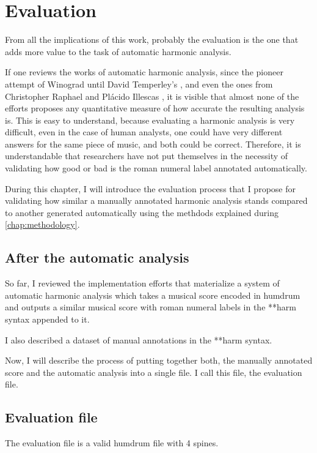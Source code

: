 \chapter{Evaluation}
\label{chap:evaluation}
From all the implications of this work, probably the evaluation is the one that adds more value to the task of automatic harmonic analysis.

If one reviews the works of automatic harmonic analysis, since the pioneer attempt of Winograd \cite{winograd1968linguistics} until David Temperley's \cite{temperley1997algorithm}, and even the ones from Christopher Raphael \cite{raphael2003harmonic} and Pl\'acido Illescas \cite{illescas2007harmonic}, it is visible that almost none of the efforts proposes any quantitative measure of how accurate the resulting analysis is. This is easy to understand, because evaluating a harmonic analysis is very difficult, even in the case of human analysts, one could have very different answers for the same piece of music, and both could be correct. Therefore, it is understandable that researchers have not put themselves in the necessity of validating how good or bad is the roman numeral label annotated automatically.

During this chapter, I will introduce the evaluation process that I propose for validating how similar a manually annotated harmonic analysis stands compared to another generated automatically using the methdods explained during \autoref{chap:methodology}.

\section{After the automatic analysis}
So far, I reviewed the implementation efforts that materialize a system of automatic harmonic analysis which takes a musical score encoded in humdrum and outputs a similar musical score with roman numeral labels in the **harm syntax appended to it.

I also described a dataset of manual annotations in the **harm syntax.

Now, I will describe the process of putting together both, the manually annotated score and the automatic analysis into a single file. I call this file, the evaluation file.

\section{Evaluation file}
	The evaluation file is a valid humdrum file with 4 spines.

